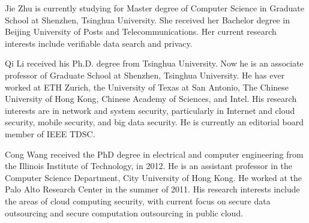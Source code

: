 

\vspace{-3.5em}

\begin{IEEEbiography}{Jie Zhu} is currently studying for Master degree of Computer Science in Graduate School at Shenzhen, Tsinghua University. She received her Bachelor degree in Beijing University of Posts and Telecommunications. Her current research interests include verifiable data search and privacy.
\end{IEEEbiography}

\vspace{-5.5em}

\begin{IEEEbiography}{Qi Li} received his Ph.D. degree from Tsinghua University. Now he is an associate professor of Graduate School at Shenzhen, Tsinghua University. He has ever worked at ETH Zurich, the University of Texas at San Antonio, The Chinese University of Hong Kong, Chinese Academy of Sciences, and Intel.
His research interests are in network and system security, particularly in Internet and cloud security, mobile security, and big data security. He is currently an editorial board member of IEEE TDSC.%
\end{IEEEbiography}

\vspace{-3.5em}

\begin{IEEEbiography}{Cong Wang} received the PhD degree in electrical and computer engineering from the Illinois Institute of Technology, in 2012. He is an assistant professor in the Computer Science Department, City University of Hong Kong. He worked at the Palo Alto Research Center in the summer of 2011. His research interests include the areas of cloud computing security, with current focus on secure data outsourcing and secure computation outsourcing in public cloud.
\end{IEEEbiography}

